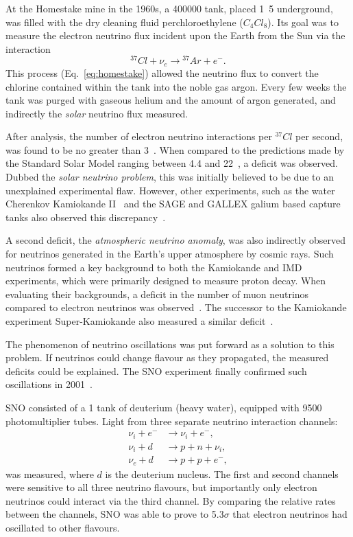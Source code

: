 At the Homestake mine in the 1960s, a \unit{400000}{} tank, placed
\unit{1.5}{} underground, was filled with the dry cleaning fluid perchloroethylene
($C_{4}Cl_{8}$). Its goal was to measure the electron neutrino flux incident upon the Earth from
the Sun via the interaction
\begin{equation} %
    {}^{37}Cl+\nu_{e}\rightarrow{}^{37}Ar+e^{-}.
    \label{eq:homestake}
\end{equation} %
This process (Eq.~\ref{eq:homestake}) allowed the neutrino flux to convert the chlorine contained
within the tank into the noble gas argon. Every few weeks the tank was purged with gaseous helium
and the amount of argon generated, and indirectly the \emph{solar} neutrino flux measured.

After analysis, the number of electron neutrino interactions per ${}^{37}Cl$ per second, was found
to be no greater than 3~\cite{davis1968}. When compared to the predictions made by the Standard
Solar Model ranging between 4.4 and 22~\cite{bahcall1968}, a deficit was observed. Dubbed the
\emph{solar neutrino problem}, this was initially believed to be due to an unexplained
experimental flaw. However, other experiments, such as the water Cherenkov Kamiokande
II~\cite{hirata1989} and the SAGE and GALLEX galium based capture tanks also observed this
discrepancy~\cite{abazov1991, anselmann1994}.

A second deficit, the \emph{atmospheric neutrino anomaly}, was also indirectly observed for
neutrinos generated in the Earth's upper atmosphere by cosmic rays. Such neutrinos formed a key
background to both the Kamiokande and IMD experiments, which were primarily designed to measure
proton decay. When evaluating their backgrounds, a deficit in the number of muon neutrinos
compared to electron neutrinos was observed~\cite{hirata1988, becker1992}. The successor to the
Kamiokande experiment Super-Kamiokande also measured a similar deficit~\cite{kajita1999}.

The phenomenon of neutrino oscillations was put forward as a solution to this problem. If
neutrinos could change flavour as they propagated, the measured deficits could be explained. The
SNO experiment finally confirmed such oscillations in 2001~\cite{ahmad2002}.

SNO consisted of a \unit{1}{} tank of deuterium (heavy water), equipped with 9500
photomultiplier tubes. Light from three separate neutrino interaction channels:
\begin{align} %
    \nu_{i}+e^{-} & \rightarrow \nu_{i}+e^{-}, \\
    \nu_{i}+d     & \rightarrow p+n+\nu_{i},   \\
    \nu_{e}+d     & \rightarrow p+p+e^{-},
\end{align}
was measured, where $d$ is the deuterium nucleus. The first and second channels were sensitive to
all three neutrino flavours, but importantly only electron neutrinos could interact via the third
channel. By comparing the relative rates between the channels, SNO was able to prove to
5.3$\sigma$ that electron neutrinos had oscillated to other flavours.

